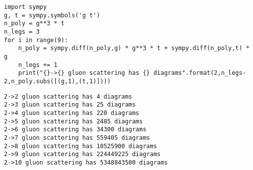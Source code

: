 \documentclass[11pt]{article}
\begin{document}
\begin{verbatim}
import sympy
g, t = sympy.symbols('g t')
n_poly = g**3 * t
n_legs = 3
for i in range(9):
    n_poly = sympy.diff(n_poly,g) * g**3 * t + sympy.diff(n_poly,t) * g
    n_legs += 1
    print("{}->{} gluon scattering has {} diagrams".format(2,n_legs-2,n_poly.subs([(g,1),(t,1)])))
\end{verbatim}

\label{}
\begin{verbatim}
2->2 gluon scattering has 4 diagrams
2->3 gluon scattering has 25 diagrams
2->4 gluon scattering has 220 diagrams
2->5 gluon scattering has 2485 diagrams
2->6 gluon scattering has 34300 diagrams
2->7 gluon scattering has 559405 diagrams
2->8 gluon scattering has 10525900 diagrams
2->9 gluon scattering has 224449225 diagrams
2->10 gluon scattering has 5348843500 diagrams
\end{verbatim}
\end{document}
